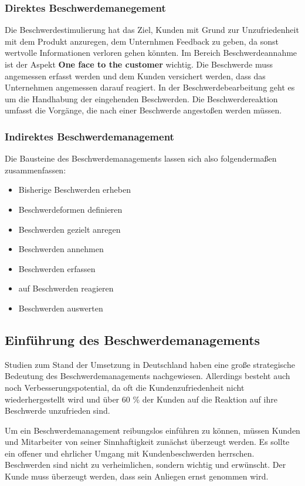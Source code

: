 \documentclass[a4paper,12pt]{article}
\begin{document}
	\subsubsection{Direktes Beschwerdemanegement}
	Die Beschwerdestimulierung hat das Ziel, Kunden mit Grund zur Unzufriedenheit mit dem Produkt anzuregen, dem Unternhmen Feedback zu geben, da sonst wertvolle Informationen verloren gehen könnten. Im Bereich Beschwerdeannahme ist der Aspekt \textbf{One face to the customer} wichtig. Die Beschwerde muss angemessen erfasst werden und dem Kunden versichert werden, dass das Unternehmen angemessen darauf reagiert. In der Beschwerdebearbeitung geht es um die Handhabung der eingehenden Beschwerden. Die Beschwerdereaktion umfasst die Vorgänge, die nach einer Beschwerde angestoßen werden müssen.  {\cite{.02.04.2016}}
	\subsubsection{Indirektes Beschwerdemanagement}
	Die Bausteine des Beschwerdemanagements lassen sich also folgendermaßen zusammenfassen:
	\begin{itemize}
		\item Bisherige Beschwerden erheben
		\item Beschwerdeformen definieren
		\item Beschwerden gezielt anregen
		\item Beschwerden annehmen
		\item Beschwerden erfassen
		\item auf Beschwerden reagieren
		\item Beschwerden auswerten
	\end{itemize}
	\subsection{Einführung des Beschwerdemanagements}
	Studien zum Stand der Umsetzung in Deutschland haben eine große strategische Bedeutung des Beschwerdemanagements nachgewiesen. Allerdings besteht auch noch Verbesserungspotential, da oft die Kundenzufriedenheit nicht wiederhergestellt wird und über 60 \% der Kunden auf die Reaktion auf ihre Beschwerde unzufrieden sind.  {\cite{.02.04.2016}}
	
	Um ein Beschwerdemanagement reibungslos einführen zu können, müssen Kunden und Mitarbeiter von seiner Sinnhaftigkeit zunächst überzeugt werden. Es sollte ein offener und ehrlicher Umgang mit Kundenbeschwerden herrschen. Beschwerden sind nicht zu verheimlichen, sondern wichtig und erwünscht. Der Kunde muss überzeugt werden, dass sein Anliegen ernst genommen wird. \cite{Franke.}
	\nocite{Wikipedia.02.03.2016}
	\nocite{.02.04.2016}
	\nocite{.02.04.2016b}
	\nocite{Franke.}
	\newpage
	\setcounter{biburllcpenalty}{7000}
	\setcounter{biburlucpenalty}{8000}
	\printbibliography
\end{document}
